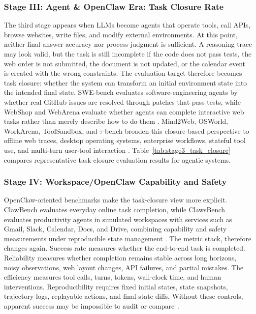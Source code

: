 
\subsubsection{Stage III: Agent \& OpenClaw Era: Task Closure Rate}

The third stage appears when LLMs become agents that operate tools, call APIs, browse websites, write files, and modify external environments. At this point, neither final-answer accuracy nor process judgment is sufficient. A reasoning trace may look valid, but the task is still incomplete if the code does not pass tests, the web order is not submitted, the document is not updated, or the calendar event is created with the wrong constraints. The evaluation target therefore becomes task closure: whether the system can transform an initial environment state into the intended final state. SWE-bench evaluates software-engineering agents by whether real GitHub issues are resolved through patches that pass tests, while WebShop and WebArena evaluate whether agents can complete interactive web tasks rather than merely describe how to do them \citep{jimenez2023swebench,yao2022webshop,zhou2023webarena}. Mind2Web, OSWorld, WorkArena, ToolSandbox, and $\tau$-bench broaden this closure-based perspective to offline web traces, desktop operating systems, enterprise workflows, stateful tool use, and multi-turn user-tool interaction \citep{deng2023mind2web,xie2024osworld,drouin2024workarena,lu2024toolsandbox,yao2024taubench,hutoward,grimes2025sok,pirch2026toward,dehghantanha2026sok,ray2025survey}. Table~\ref{tab:stage3_task_closure} compares representative task-closure evaluation results for agentic systems.




\subsubsection{Stage IV: Workspace/OpenClaw Capability and Safety}

OpenClaw-oriented benchmarks make the task-closure view more explicit. ClawBench evaluates everyday online task completion, while ClawsBench evaluates productivity agents in simulated workspaces with services such as Gmail, Slack, Calendar, Docs, and Drive, combining capability and safety measurements under reproducible state management \citep{zhang2026clawbench,li2026clawsbench}. The metric stack, therefore changes again. Success rate measures whether the end-to-end task is completed. Reliability measures whether completion remains stable across long horizons, noisy observations, web layout changes, API failures, and partial mistakes. The efficiency measures tool calls, turns, tokens, wall-clock time, and human interventions. Reproducibility requires fixed initial states, state snapshots, trajectory logs, replayable actions, and final-state diffs. Without these controls, apparent success may be impossible to audit or compare~\citep{la2026design,hasan2026breaks,catalano2025agent,zhang2026litmus,ge2026governance}.

